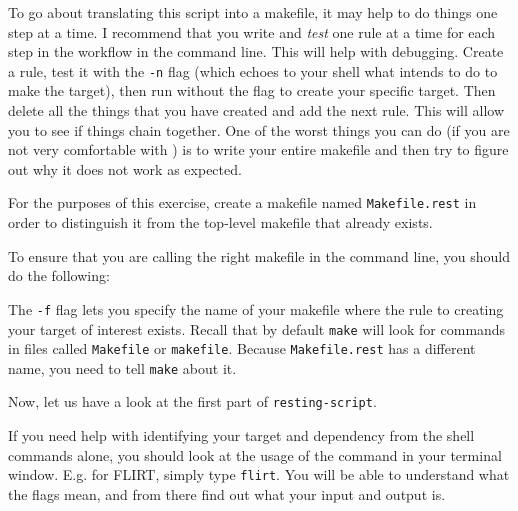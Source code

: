 To go about translating this script into a makefile, it may help to do things one step at a time. I recommend that you write and \emph{test} one rule at a time for each step in the workflow in the command line. This will help with debugging. Create a rule, test it with the \texttt{-n} flag (which echoes to your shell what \maken{} intends to do to make the target), then run \maken{} without the flag to create your specific target. Then delete all the things that you have created and add the next rule. This will allow you to see if things chain together. One of the worst things you can do (if you are not very comfortable with \maken{}) is to write your entire makefile and then try to figure out why it does not work as expected. 

For the purposes of this exercise, create a makefile named \texttt{Makefile.rest} in order to distinguish it from the top-level makefile that already exists.

To ensure that you are calling the right makefile in the command line, you should do the following: 

The \texttt{-f} flag lets you specify the name of your makefile where the rule to creating your target of interest exists. Recall that by default \texttt{make} will look for commands in files called \texttt{Makefile} or \texttt{makefile}. Because \texttt{Makefile.rest} has a different name, you need to tell \texttt{make} about it. 

Now, let us have a look at the first part of \texttt{resting-script}.

If you need help with identifying your target and dependency from the shell commands alone, you should look at the usage of the command in your terminal window. E.g. for FLIRT, simply type \texttt{flirt}. You will be able to understand what the flags mean, and from there find out what your input and output is.

